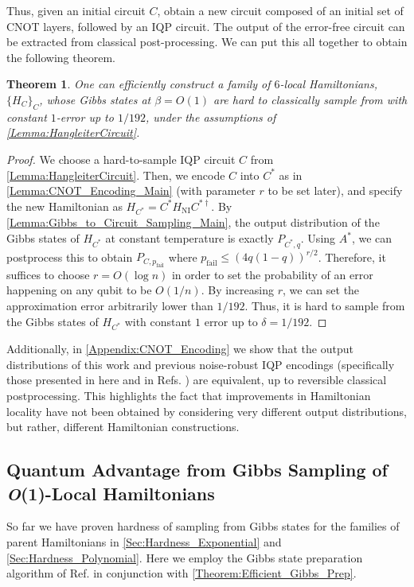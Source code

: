 \documentclass[a4paper,onecolumn,11pt,accepted=2017-05-09]{quantumarticle}
\newcommand{\HNI}{H_{\text{NI}}}
\newcommand{\pfail}{p_{\text{fail}}}
\newtheorem{theorem}{Theorem}
\begin{document}
Thus, given an initial circuit $C$, obtain a new circuit composed of an initial set of CNOT layers, followed by an IQP circuit.
The output of the error-free circuit can be extracted from classical post-processing.
We can put this all together to obtain the following theorem. 

\begin{theorem}\label{Theorem:Constant_Precision_Hardness}
    One can efficiently construct a family of $6$-local Hamiltonians, $\{ H_C\}_C$, whose Gibbs states at $\beta = O(1)$ are hard to classically sample from with constant $1$-error up to $1/192$, under the assumptions of \cref{Lemma:HangleiterCircuit}.
\end{theorem}
\begin{proof}
    We choose a hard-to-sample IQP circuit $C$ from \cref{Lemma:HangleiterCircuit}. 
    Then, we encode $C$ into $C^*$ as in \cref{Lemma:CNOT_Encoding_Main} (with parameter $r$ to be set later), and specify the new Hamiltonian as $H_{C^*}= C^*\HNI C^{*\dagger}$. 
    By \cref{Lemma:Gibbs_to_Circuit_Sampling_Main}, the output distribution of the Gibbs states of $H_{C^*}$ at constant temperature is exactly $P_{C^*,q}$. 
    Using $A^*$, we can postprocess this to obtain $P_{C,\pfail}$ where $\pfail \leq (4q(1-q))^{r/2}$.
    Therefore, it suffices to choose  $r = O(\log n)$ in order to set the probability of an error happening on any qubit to be $O(1/n)$. By increasing $r$, we can set the approximation error arbitrarily lower than $1/192$. Thus, it is hard to sample from the Gibbs states of $H_{C^*}$ with constant $1$ error up to $\delta = 1/192$.
\end{proof}


Additionally, in \cref{Appendix:CNOT_Encoding} we show that the output distributions of this work and previous noise-robust IQP encodings (specifically those presented in here and in Refs. \cite{Bremner_2017, bergamaschi2024sample}) are equivalent, up to reversible classical postprocessing. 
This highlights the fact that improvements in Hamiltonian locality have not been obtained by considering very different output distributions, but rather, different Hamiltonian constructions.


\subsection{Quantum Advantage from Gibbs Sampling of \textit{O}(1)-Local Hamiltonians}

So far we have proven hardness of sampling from Gibbs states for the families of parent Hamiltonians in \cref{Sec:Hardness_Exponential} and \cref{Sec:Hardness_Polynomial}.
Here we employ the Gibbs state preparation algorithm of Ref. \cite{chen2023quantum} in conjunction with \cref{Theorem:Efficient_Gibbs_Prep}.
\end{document}
